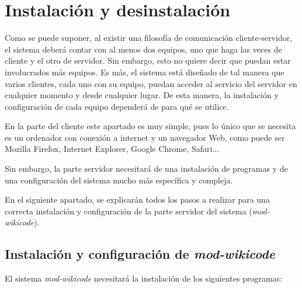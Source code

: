 \chapter[Instalación y desinstalación]{\label{}
Instalación y desinstalación}

Como se puede suponer, al existir una filosofía de comunicación cliente-servidor, el sistema deberá contar con al menos dos equipos, uno que haga las veces de cliente y el otro de servidor. Sin embargo, esto no quiere decir que puedan estar involucrados más equipos. Es más, el sistema está diseñado de tal manera que varios clientes, cada uno con su equipo, puedan acceder al servicio del servidor en cualquier momento y desde cualquier lugar. De esta manera, la instalación y configuración de cada equipo dependerá de para qué se utilice.

En la parte del cliente este apartado es muy simple, pues lo único que se necesita es un ordenador con conexión a internet y un navegador Web, como puede ser Mozilla Firefox, Internet Explorer, Google Chrome, Safari...

Sin embargo, la parte servidor necesitará de una instalación de programas y de una configuración del sistema mucho más específica y compleja.

En el siguiente apartado, se explicarán todos los pasos a realizar para una correcta instalación y configuración de la parte servidor del sistema (\emph{mod-wikicode}).

\section{Instalación y configuración de \emph{mod-wikicode}}

El sistema \emph{mod-wikicode} necesitará la instalación de los siguientes programas:

